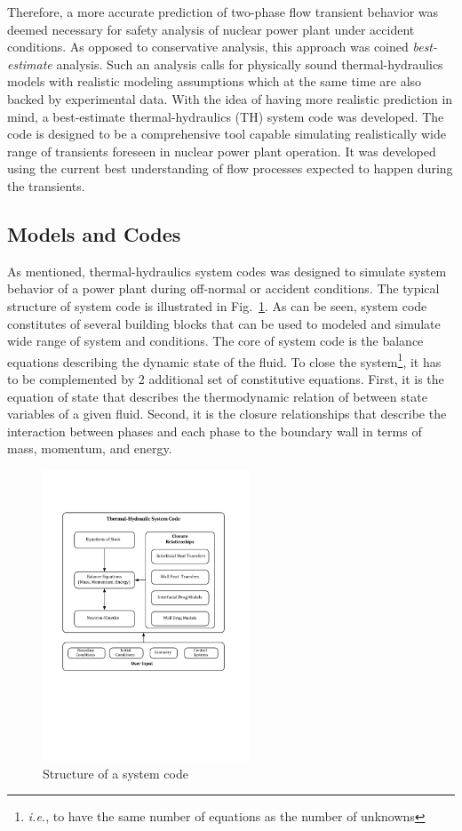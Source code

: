 \documentclass[11pt,titlepage]{article}
\begin{document}
Therefore, a more accurate prediction of two-phase flow transient behavior was deemed necessary for safety analysis of nuclear power plant under accident conditions.
As opposed to conservative analysis, this approach was coined \textit{best-estimate} analysis. 
Such an analysis calls for physically sound thermal-hydraulics models with realistic modeling assumptions which at the same time are also backed by experimental data.
With the idea of having more realistic prediction in mind, a best-estimate thermal-hydraulics (TH) system code was developed.
The code is designed to be a comprehensive tool capable simulating realistically wide range of transients foreseen in nuclear power plant operation.
It was developed using the current best understanding of flow processes expected to happen during the transients.
 
\subsection{Models and Codes}

As mentioned, thermal-hydraulics system codes was designed to simulate system behavior of a power plant during off-normal or accident conditions. 
The typical structure of system code is illustrated in Fig.~\ref{fig:systemCode}. 
As can be seen, system code constitutes of several building blocks that can be used to modeled and simulate wide range of system and conditions. 
The core of system code is the balance equations describing the dynamic state of the fluid. 
To close the system\footnote{\textit{i.e.}, to have the same number of equations as the number of unknowns}, it has to be complemented by 2 additional set of constitutive equations. 
First, it is the equation of state that describes the thermodynamic relation of between state variables of a given fluid. 
Second, it is the closure relationships that describe the interaction between phases and each phase to the boundary wall in terms of mass, momentum, and energy.  
\begin{figure}[htbp]
	\centering
	\includegraphics[width=0.55\textwidth]{SystemCode.pdf}
	\caption{Structure of a system code}
	\label{fig:systemCode}
\end{figure}
\end{document}
